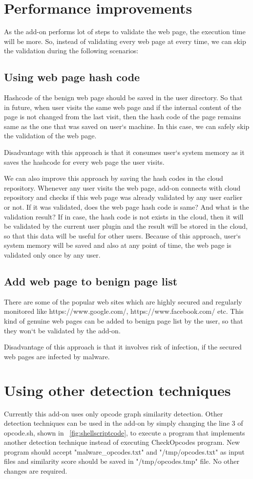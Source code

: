 \section{Performance improvements} 
As the add-on performs lot of steps to validate the web page, the execution time will be more. So, instead of validating every web page at every time, we can skip the validation during the following scenarios: 
\subsection{Using web page hash code}
Hashcode of the benign web page should be saved in the user directory. So that in future, when user visits the same web page and if the internal content of the page is not changed from the last visit, then the hash code of the page remains same as the one that was saved on user`s machine. In this case, we can safely skip the validation of the web page. 

Disadvantage with this approach is that it consumes user`s system memory as it saves the hashcode for every web page the user visits. 

We can also improve this approach by saving the hash codes in the cloud repository. Whenever any user visits the web page, add-on connects with cloud repository and checks if this web page was already validated by any user earlier or not. If it was validated, does the web page hash code is same? And what is the validation result? If in case, the hash code is not exists in the cloud, then it will be validated by the current user plugin and the result will be stored in the cloud, so that this data will be useful for other users. Because of this approach, user`s system memory will be saved and also at any point of time, the web page is validated only once by any user.
 
\subsection{Add web page to benign page list} 
There are some of the popular web sites which are highly secured and regularly monitored like https://www.google.com/, https://www.facebook.com/ etc. This kind of genuine web pages can be added to benign page list by the user, so that they won`t be validated by the add-on.

Disadvantage of this approach is that it involves risk of infection, if the secured web pages are infected by malware.

\section{Using other detection techniques} 
Currently this add-on uses only opcode graph similarity detection. Other detection techniques can be used in the add-on by simply changing the line 3 of opcode.sh, shown in ~\ref{fig:shellscriptcode}, to execute a program that implements another detection technique instead of executing CheckOpcodes program. New program should accept "malware\_opcodes.txt" and "/tmp/opcodes.txt" as input files and similarity score should be saved in "/tmp/opcodes.tmp" file. No other changes are required. 